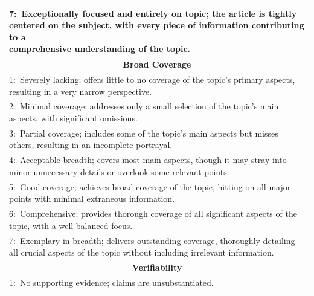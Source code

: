 \begin{table}
{\begin{tabular}{l}
\makecell[l]{7:~Exceptionally focused and entirely on topic; the article is tightly centered on the subject, with every piece of information contributing to a\\ comprehensive understanding of the topic.}  \\ 
\midrule
\multicolumn{1}{c}{\textbf{Broad Coverage}}                                                                                                                                                  \\ 
\midrule
1:~Severely lacking; offers little to no coverage of the topic's primary aspects, resulting in a very narrow perspective.                                                                    \\
2:~Minimal coverage; addresses only a small selection of the topic's main aspects, with significant omissions.                                                                               \\
3:~Partial coverage; includes some of the topic's main aspects but misses others, resulting in an incomplete portrayal.                                                                      \\
4:~Acceptable breadth; covers most main aspects, though it may stray into minor unnecessary details or overlook some relevant points.                                                        \\
5:~Good coverage; achieves broad coverage of the topic, hitting on all major points with minimal extraneous information.                                                                     \\
6:~Comprehensive; provides thorough coverage of all significant aspects of the topic, with a well-balanced focus.                                                                            \\
7:~Exemplary in breadth; delivers outstanding coverage, thoroughly detailing all crucial aspects of the topic without including irrelevant information.                                      \\ 
\midrule
\multicolumn{1}{c}{\textbf{Verifiability}}                                                                                                                                                   \\ 
\midrule
1:~No supporting evidence; claims are unsubstantiated.                                                                                                                                       \\

\end{tabular}}
\end{table}
